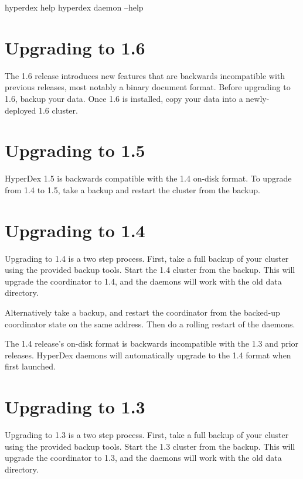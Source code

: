 \begin{consolecode}
hyperdex help
hyperdex daemon --help
\end{consolecode}

\section{Upgrading to 1.6}
\label{sec:installation:upgrade1.6}

The 1.6 release introduces new features that are backwards incompatible with
previous releases, most notably a binary document format.  Before upgrading to
1.6, backup your data.  Once 1.6 is installed, copy your data into a
newly-deployed 1.6 cluster.

\section{Upgrading to 1.5}
\label{sec:installation:upgrade1.5}

HyperDex 1.5 is backwards compatible with the 1.4 on-disk format.  To upgrade
from 1.4 to 1.5, take a backup and restart the cluster from the backup.

\section{Upgrading to 1.4}
\label{sec:installation:upgrade1.4}

Upgrading to 1.4 is a two step process.  First, take a full backup of your
cluster using the provided backup tools.  Start the 1.4 cluster from the
backup.  This will upgrade the coordinator to 1.4, and the daemons will work
with the old data directory.

Alternatively take a backup, and restart the coordinator from the backed-up
coordinator state on the same address.  Then do a rolling restart of the
daemons.

The 1.4 release's on-disk format is backwards incompatible with the 1.3 and
prior releases.  HyperDex daemons will automatically upgrade to the 1.4 format
when first launched.

\section{Upgrading to 1.3}
\label{sec:installation:upgrade1.3}

Upgrading to 1.3 is a two step process.  First, take a full backup of your
cluster using the provided backup tools.  Start the 1.3 cluster from the
backup.  This will upgrade the coordinator to 1.3, and the daemons will work
with the old data directory.


